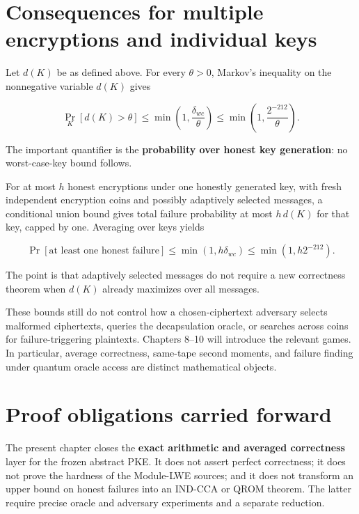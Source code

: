 \documentclass[
  11pt,
  a4paper,
  oneside]{report}
\begin{document}
\section{Consequences for multiple encryptions and individual
keys}\label{consequences-for-multiple-encryptions-and-individual-keys}

Let \(d(K)\) be as defined above. For every \(\theta>0\), Markov's
inequality on the nonnegative variable \(d(K)\) gives

\[
\Pr_K[d(K)>\theta]
\le\min\!\left(1,\frac{\delta_{wc}}{\theta}\right)
\le\min\!\left(1,\frac{2^{-212}}{\theta}\right).
\]

The important quantifier is the \textbf{probability over honest key
generation}: no worst-case-key bound follows.

For at most \(h\) honest encryptions under one honestly generated key,
with fresh independent encryption coins and possibly adaptively selected
messages, a conditional union bound gives total failure probability at
most \(h\,d(K)\) for that key, capped by one. Averaging over keys yields

\[
\Pr[\text{at least one honest failure}]
\le\min(1,h\delta_{wc})
\le\min(1,h2^{-212}).
\]

The point is that adaptively selected messages do not require a new
correctness theorem when \(d(K)\) already maximizes over all messages.

These bounds still do not control how a chosen-ciphertext adversary
selects malformed ciphertexts, queries the decapsulation oracle, or
searches across coins for failure-triggering plaintexts. Chapters 8--10
will introduce the relevant games. In particular, average correctness,
same-tape second moments, and failure finding under quantum oracle
access are distinct mathematical objects.

\section{Proof obligations carried
forward}\label{proof-obligations-carried-forward}

The present chapter closes the \textbf{exact arithmetic and averaged
correctness} layer for the frozen abstract PKE. It does not assert
perfect correctness; it does not prove the hardness of the Module-LWE
sources; and it does not transform an upper bound on honest failures
into an IND-CCA or QROM theorem. The latter require precise oracle and
adversary experiments and a separate reduction.
\end{document}
